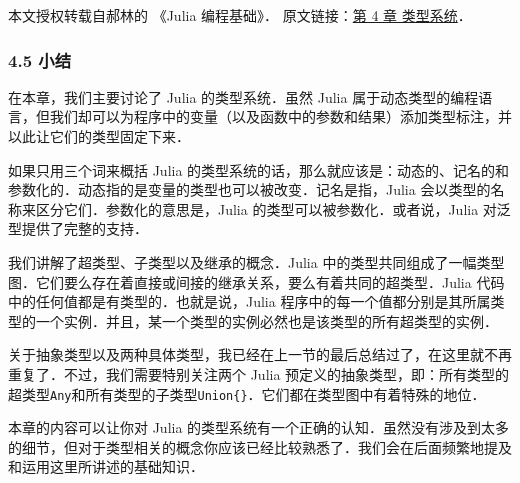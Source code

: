 
本文授权转载自郝林的 《Julia 编程基础》． 原文链接：\href{https://github.com/hyper0x/JuliaBasics/blob/master/book/ch04.md}{第 4 章 类型系统}．


\subsubsection{4.5 小结}

在本章，我们主要讨论了 Julia 的类型系统．虽然 Julia 属于动态类型的编程语言，但我们却可以为程序中的变量（以及函数中的参数和结果）添加类型标注，并以此让它们的类型固定下来．

如果只用三个词来概括 Julia 的类型系统的话，那么就应该是：动态的、记名的和参数化的．动态指的是变量的类型也可以被改变．记名是指，Julia 会以类型的名称来区分它们．参数化的意思是，Julia 的类型可以被参数化．或者说，Julia 对泛型提供了完整的支持．

我们讲解了超类型、子类型以及继承的概念．Julia 中的类型共同组成了一幅类型图．它们要么存在着直接或间接的继承关系，要么有着共同的超类型．Julia 代码中的任何值都是有类型的．也就是说，Julia 程序中的每一个值都分别是其所属类型的一个实例．并且，某一个类型的实例必然也是该类型的所有超类型的实例．

关于抽象类型以及两种具体类型，我已经在上一节的最后总结过了，在这里就不再重复了．不过，我们需要特别关注两个 Julia 预定义的抽象类型，即：所有类型的超类型\verb|Any|和所有类型的子类型\verb|Union{}|．它们都在类型图中有着特殊的地位．

本章的内容可以让你对 Julia 的类型系统有一个正确的认知．虽然没有涉及到太多的细节，但对于类型相关的概念你应该已经比较熟悉了．我们会在后面频繁地提及和运用这里所讲述的基础知识．

